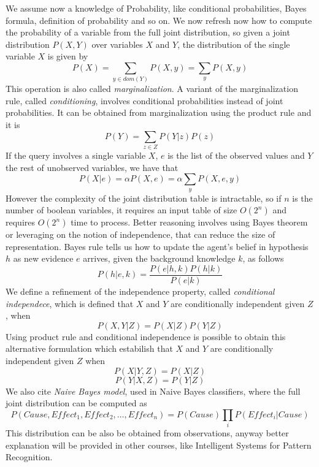 We assume now a knowledge of Probability, like conditional probabilities, Bayes formula, 
definition of probability and so on.\newline
We now refresh now how to compute the probability of a variable from the full joint
distribution, so given a joint distribution $P(X, Y)$ over variables $X$ and $Y$,
the distribution of the single variable $X$ is given by
\[ P(X) = \sum _{y \in dom(Y)} P(X, y) = \sum _y P(X, y) \]
This operation is also called \emph{marginalization}.
A variant of the marginalization rule, called \emph{conditioning}, involves conditional 
probabilities instead of joint probabilities.\newline
It can be obtained from marginalization using the product rule and it is 
\[ P(Y) = \sum _{z \in Z} P(Y | z) P(z) \]
If the query involves a single variable $X$, $e$ is the list of the observed values and 
$Y$ the rest of unobserved variables, we have that 
\[ P(X | e) = \alpha P(X, e) = \alpha \sum_y P(X, e, y) \]
However the complexity of the joint distribution table is intractable, so if $n$ is the 
number of boolean variables, it requires an input table of size $O(2^n)$ and requires
$O(2^n)$ time to process.\newline
Better reasoning involves using Bayes theorem or leveraging on the notion of independence,
that can reduce the size of representation.\newline
Bayes rule tells us how to update the agent's belief in hypothesis $h$ as new evidence
$e$ arrives, given the background knowledge $k$, as follows
\[ P(h | e, k) = \frac{P(e | h, k) P(h | k)}{P(e | k)} \]
We define a refinement of the independence property, called \emph{conditional independece},
which is defined that $X$ and $Y$ are conditionally independent given $Z$, when 
\[ P(X, Y | Z) = P(X | Z) P(Y | Z) \]
Using product rule and conditional independence is possible to obtain this alternative 
formulation which estabilish that $X$ and $Y$ are conditionally independent given $Z$ when
\[ P(X | Y, Z) = P(X | Z) \]
\[ P(Y | X, Z) = P(Y | Z) \]
We also cite \emph{Naive Bayes model}, used in Naive Bayes classifiers, where the full joint
distribution can be computed as 
\[ P(Cause, Effect_1, Effect_2, \dots, Effect_n) = P(Cause) \prod _i P(Effect_i | Cause) \]
This distribution can be also be obtained from observations, anyway better explanation
will be provided in other courses, like Intelligent Systems for Pattern Recognition.


